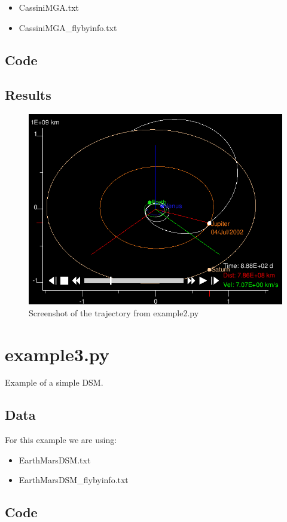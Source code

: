 \documentclass[a4paper,11pt]{article}
\begin{document}
\begin{itemize}
\item CassiniMGA.txt
\item CassiniMGA\_flybyinfo.txt
\end{itemize}
\subsection{Code}

\subsection{Results}
\begin{figure}[H]
\centering
\includegraphics[width=1\textwidth]{img/example2}
\caption{Screenshot of the trajectory from example2.py}
\label{img:example2}
\end{figure}


\newpage
\section{example3.py}
Example of a simple \gls{DSM}.
\subsection{Data}
For this example we are using:

\begin{itemize}
\item EarthMarsDSM.txt
\item EarthMarsDSM\_flybyinfo.txt
\end{itemize}
\subsection{Code}

\end{document}

